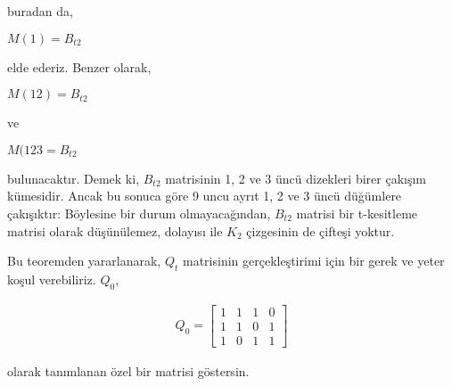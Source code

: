 \documentclass[11pt]{amsbook}
\begin{document}

    buradan da,
    
    \qquad $M(1)=B_{t2}$
    
    elde ederiz. Benzer olarak,
    
    \qquad $M(12)=B_{t2}$
    
    ve
    
    \qquad $M(123 =B_{t2}$
    
    bulunacaktır. Demek ki, $B_{t2}$ matrisinin 1, 2 ve 3 üncü dizekleri birer çakışım kümesidir. Ancak bu sonuca göre 9 uncu ayrıt 1, 2 ve 3 üncü düğümlere çakışıktır: Böylesine bir durum olmayacağından, $B_{t2}$ matrisi bir t-kesitleme matrisi olarak düşünülemez, dolayısı ile $K_{2}$ çizgesinin de çifteşi yoktur.
    
    Bu teoremden yararlanarak, $Q_{t}$ matrisinin gerçekleştirimi için bir gerek ve yeter koşul verebiliriz. $Q_{0}$,
    
    \begin{align*}
    Q_{0}=
        \begin{bmatrix}
        1 & 1 & 1 & 0 \\
        1 & 1 & 0 & 1 \\
        1 & 0 & 1 & 1
        \end{bmatrix}
    \end{align*}
    
    olarak tanımlanan özel bir matrisi göstersin.
\end{document}
